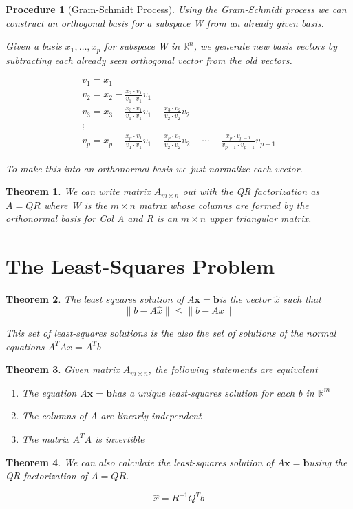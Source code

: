 \documentclass[12pt]{report}
\newtheorem{thm}{Theorem}
\newtheorem{proc}{Procedure}
\newcommand{\mtx}[3]{$#1_{#2\times #3}$}
\newcommand{\mateq}{$A\bm{x}=\bm{b}$}
\begin{document}
\begin{proc}[Gram-Schmidt Process]
Using the Gram-Schmidt process we can construct an orthogonal basis for a subspace W from an already given basis.

Given a basis ${x_1, \ldots, x_p}$ for subspace W in $\mathbb{R}^n$, we generate new basis vectors by subtracting each already seen orthogonal vector from the old vectors.

\begin{eqnarray*}
v_1 = x_1 \\
v_2 = x_2 - \frac{x_2 \cdot v_1}{v_1 \cdot v_1} v_1 \\
v_3 = x_3 - \frac{x_3 \cdot v_1}{v_1 \cdot v_1} v_1 - \frac{x_3 \cdot v_2}{v_2 \cdot v_2} v_2 \\
\vdots \\
v_p = x_p - \frac{x_p \cdot v_1}{v_1 \cdot v_1} v_1 - \frac{x_p \cdot v_2}{v_2 \cdot v_2} v_2 - \cdots - \frac{x_p \cdot v_{p-1}}{v_{p-1} \cdot v_{p-1}} v_{p-1}
\end{eqnarray*}

To make this into an orthonormal basis we just normalize each vector.

\end{proc}

\begin{thm}
We can write matrix \mtx{A}{m}{n} out with the QR factorization as $A=QR$ where W is the $m \times n$ matrix whose columns are formed by the orthonormal basis for Col A and R is an $m\times n$ upper triangular matrix.
\end{thm}

\section{The Least-Squares Problem}

\begin{thm}
The least squares solution of \mateq is the vector $\hat{x}$ such that
\begin{equation}
\|b-A\hat{x}\| \leq \|b-Ax\|
\end{equation}

This set of least-squares solutions is the also the set of solutions of the normal equations $A^TAx=A^Tb$

\end{thm}

\begin{thm}
Given matrix \mtx{A}{m}{n}, the following statements are equivalent

\begin{enumerate}
\item The equation \mateq has a unique least-squares solution for each b in $\mathbb{R}^m$
\item The columns of A are linearly independent
\item The matrix $A^TA$ is invertible
\end{enumerate}

\end{thm}

\begin{thm}
We can also calculate the least-squares solution of \mateq using the QR factorization of $A=QR$.

\begin{equation}
\hat{x} = R^{-1}Q^Tb
\end{equation}

\end{thm}
\end{document}
